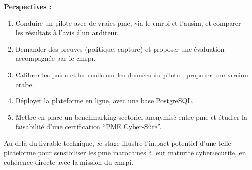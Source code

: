 \vspace{0.5cm}
\textbf{Perspectives :}

\begin{enumerate}
  \item Conduire un pilote avec de vraies \gls{pme}, via le \gls{cmrpi} et l'\gls{ausim}, et comparer les résultats à l'avis d'un auditeur.
  \item Demander des preuves (politique, capture) et proposer une évaluation accompagnée par le \gls{cmrpi}.
  \item Calibrer les poids et les seuils sur les données du pilote ; proposer une version arabe.
  \item Déployer la plateforme en ligne, avec une base PostgreSQL.
  \item Mettre en place un benchmarking sectoriel anonymisé entre \gls{pme} et étudier la faisabilité d'une certification \enquote{PME Cyber-Sûre}.
\end{enumerate}

\vspace{0.5cm}
Au-delà du livrable technique, ce stage illustre l'impact potentiel d'une telle plateforme pour sensibiliser les \gls{pme} marocaines à leur maturité cybersécurité, en cohérence directe avec la mission du \gls{cmrpi}.
